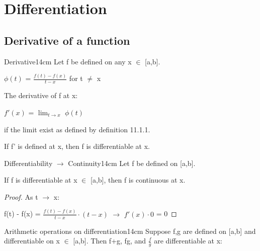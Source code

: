 \newpage

\section[Day 12: Differentiation]{ Differentiation }

\subsection{ Derivative of a function }

    \begin{definition}{Derivative}{14cm}
        Let f be defined on any x $\in$ [a,b].

        \hspace{1cm}
        $\phi(t)$ = $\frac{f(t) - f(x)}{t - x}$ for t $\not =$ x
        
        The derivative of f at x:

        \hspace{1cm}
        $f'(x)$ = $\lim_{t \rightarrow x}$ $\phi(t)$

        if the limit exist as defined by {\color{blue} definition 11.1.1}.

        If f' is defined at x, then f is differentiable at x.
    \end{definition}

    \vspace{0.5cm}



    \begin{wtheorem}{Differentiability $\rightarrow$ Continuity}{14cm}
        Let f be defined on [a,b].
        
        If f is differentiable at x $\in$ [a,b], then f is continuous at x.        
    \end{wtheorem}

    \begin{proof}
        As t $\rightarrow$ x:

        \hspace{1cm}
        f(t) - f(x)
        = $\frac{f(t)- f(x)}{t-x} \cdot (t-x)$
        $\rightarrow$ $f'(x) \cdot 0$
        = 0
    \end{proof}

    \vspace{0.5cm}



    \begin{wtheorem}{Arithmetic operations on differentiation}{14cm}
        Suppose f,g are defined on [a,b] and differentiable on
        x $\in$ [a,b]. Then f+g, fg, and $\frac{f}{g}$ are differentiable at x:        
    \end{wtheorem}

